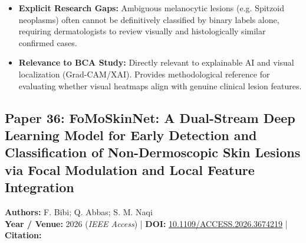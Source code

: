 \documentclass[11pt,a4paper]{article}
\begin{document}
\begin{itemize}
\item \textbf{Explicit Research Gaps:} Ambiguous melanocytic lesions (e.g. Spitzoid neoplasms) often cannot be definitively classified by binary labels alone, requiring dermatologists to review visually and histologically similar confirmed cases.
\item \textbf{Relevance to BCA Study:} Directly relevant to explainable AI and visual localization (Grad-CAM/XAI). Provides methodological reference for evaluating whether visual heatmaps align with genuine clinical lesion features.
\end{itemize}

\subsection{Paper 36: FoMoSkinNet: A Dual-Stream Deep Learning Model for Early Detection and Classification of Non-Dermoscopic Skin Lesions via Focal Modulation and Local Feature Integration}
\textbf{Authors:} F. Bibi; Q. Abbas; S. M. Naqi \\
\textbf{Year / Venue:} 2026 (\textit{IEEE Access}) | \textbf{DOI:} \href{https://doi.org/10.1109/ACCESS.2026.3674219}{10.1109/ACCESS.2026.3674219} | \textbf{Citation:} \cite{11435372}
\end{document}
